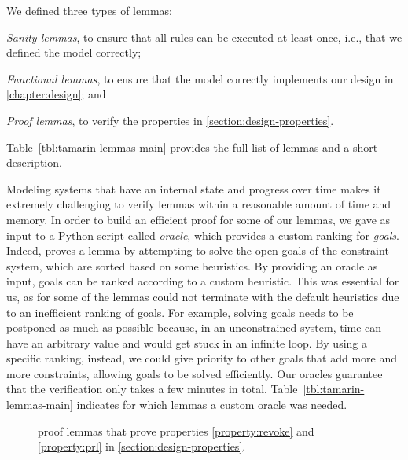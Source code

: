 

We defined three types of lemmas:
%
\begin{inparaenum}
  \item \emph{Sanity lemmas}, to ensure that all rules can be executed at least
  once, i.e., that we defined the model correctly;
  \item \emph{Functional lemmas}, to ensure that the model correctly implements
  our design in \cref{chapter:design}; and
  \item \emph{Proof lemmas}, to verify the properties in \cref{section:design-properties}.
\end{inparaenum}
%
Table~\ref{tbl:tamarin-lemmas-main} provides the full list of lemmas and a short
description.

Modeling systems that have an internal state and progress over time makes it
extremely challenging to verify lemmas within a reasonable amount of time and
memory. In order to build an efficient proof for some of our lemmas, we gave as
input to \tamarin{} a Python script called \emph{oracle}, which provides a
custom ranking for \emph{goals}. Indeed, \tamarin{} proves a lemma by attempting
to solve the open goals of the constraint system, which are sorted based on some
heuristics. By providing an oracle as input, goals can be ranked according to a
custom heuristic. This was essential for us, as for some of the lemmas
\tamarin{} could not terminate with the default heuristics due to an inefficient
ranking of goals. For example, solving  goals needs to be
postponed as much as possible because, in an unconstrained system, time can have
an arbitrary value and \tamarin{} would get stuck in an infinite loop. By using
a specific ranking, instead, we could give priority to other goals that add more
and more constraints, allowing  goals to be solved
efficiently. Our oracles guarantee that the verification only takes a few
minutes in total. Table~\ref{tbl:tamarin-lemmas-main} indicates for which lemmas a
custom oracle was needed.


\begin{figure}
    \centering
      
    \caption{\tamarin{} proof lemmas that prove properties \ref{property:revoke}
    and \ref{property:prl} in \cref{section:design-properties}.}
    \label{listing:tamarin}
  \end{figure}%

